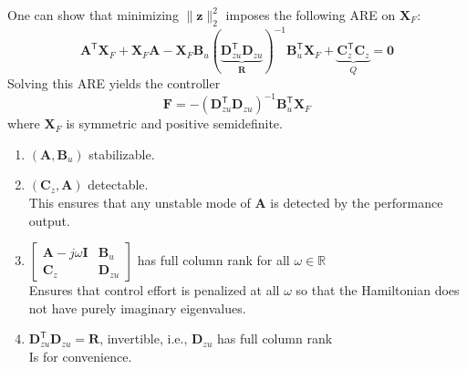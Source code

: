 \newpar{}

One can show that minimizing $\|\mathbf{z}\|_2^2$ imposes the following ARE on $\mathbf{X}_F$:
\begin{equation*}
    \mathbf{A}^{\mathsf{T}}\mathbf{X}_F + \mathbf{X}_F \mathbf{A} - \mathbf{X}_F \mathbf{B}_u{\left(\underbrace{\mathbf{D}_{zu}^{\mathsf{T}}\mathbf{D}_{zu}}_{\mathbf{R}}\right)}^{-1} \mathbf{B}_u^{\mathsf{T}} \mathbf{X}_F + \underbrace{\mathbf{C}_z^{\mathsf{T}}\mathbf{C}_z}_{Q} = \mathbf{0}
\end{equation*}
Solving this ARE yields the controller
\begin{equation*}
    \mathbf{F} = -{\left(\mathbf{D}_{zu}^{\mathsf{T}}\mathbf{D}_{zu}\right)}^{-1} \mathbf{B}_u^{\mathsf{T}}\mathbf{X}_F
\end{equation*}
where $\mathbf{X}_F$ is symmetric and positive semidefinite.

\newpar{}

\begin{enumerate}
    \item $(\mathbf{A},\mathbf{B}_u)$ stabilizable.     %
    \item $(\mathbf{C}_z,\mathbf{A})$ detectable.\\
          This ensures that any unstable mode of $\mathbf{A}$ is detected by the performance output.
    \item $\begin{bmatrix} \mathbf{A}- j\omega \mathbf{I}& \mathbf{B}_u\\ \mathbf{C}_z& \mathbf{D}_{zu}\end{bmatrix}$ has full column rank for all $\omega\in\mathbb{R}$\\
          Ensures that control effort is penalized at all $\omega$ so that the Hamiltonian does not have purely imaginary eigenvalues.
    \item $\mathbf{D}_{zu}^{\mathsf{T}}\mathbf{D}_{zu}=\mathbf{R}$, invertible, i.e., $\mathbf{D}_{zu}$ has full column rank\\
          Is for convenience.
\end{enumerate}

\newpar{}

